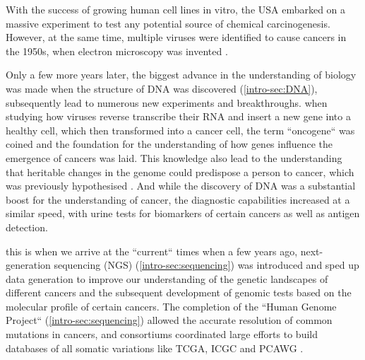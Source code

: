 With the success of growing human cell lines in vitro, the USA embarked on a massive experiment to test any potential source of chemical carcinogenesis. However, at the same time, multiple viruses were identified to cause cancers in the 1950s, when electron microscopy was invented \cite{Claude1947}.

Only a few more years later, the biggest advance in the understanding of biology was made when the structure of DNA was discovered \cite{Watson1953} (\autoref{intro-sec:DNA}),  subsequently lead to numerous new experiments and breakthroughs.  when studying how viruses  reverse transcribe their RNA and insert a new gene into a healthy cell, which then transformed into a cancer cell, the term ``oncogene`` was coined \cite{Huebner1969,Baltimore1970,Temin1970} and the foundation for the understanding of how genes influence the emergence of cancers was laid. This knowledge also lead to the understanding that heritable changes in the genome could predispose a person to cancer, which was previously hypothesised \cite{Li1969}. And while the discovery of DNA was a substantial boost for the understanding of cancer, the diagnostic capabilities increased at a similar speed, with urine tests for biomarkers of certain cancers as well as antigen detection.

 this is when we arrive at the ``current`` times when a few years ago, next-generation sequencing (NGS) (\autoref{intro-sec:sequencing}) was introduced and sped up data generation to improve our understanding of the genetic landscapes of different cancers and the subsequent development of genomic tests based on the molecular profile of certain cancers.
The completion of the ``Human Genome Project`` (\autoref{intro-sec:sequencing}) allowed the accurate resolution of common mutations in cancers, and consortiums coordinated large efforts to build databases of all somatic variations like TCGA, ICGC and PCAWG \cite{IPCAWGC2020}.

\cite{Mersch2014}\cite{Li1969}\cite{Tiao2020}

